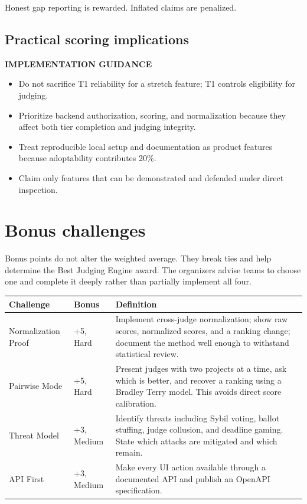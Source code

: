 \documentclass[11pt]{article}
\newcommand{\advisory}{\textcolor{DeepBlue}{\textbf{IMPLEMENTATION GUIDANCE}}}
\begin{document}
\begin{keybox}
Honest gap reporting is rewarded. Inflated claims are penalized.
\end{keybox}

\subsection{Practical scoring implications}

\advisory\par


\begin{itemize}
  \item Do not sacrifice T1 reliability for a stretch feature; T1 controls eligibility for judging.
  \item Prioritize backend authorization, scoring, and normalization because they affect both tier completion and judging integrity.
  \item Treat reproducible local setup and documentation as product features because adoptability contributes 20\%.
  \item Claim only features that can be demonstrated and defended under direct inspection.
\end{itemize}

\section{Bonus challenges}

Bonus points do not alter the weighted average. They break ties and help determine the Best Judging Engine award. The organizers advise teams to choose one and complete it deeply rather than partially implement all four.

\begin{longtable}{@{}L{43mm}L{27mm}L{88mm}@{}}
\toprule
\textbf{Challenge} & \textbf{Bonus} & \textbf{Definition}\\
\midrule
\endhead%
Normalization Proof & +5, Hard & Implement cross-judge normalization; show raw scores, normalized scores, and a ranking change; document the method well enough to withstand statistical review.\\
Pairwise Mode & +5, Hard & Present judges with two projects at a time, ask which is better, and recover a ranking using a Bradley\textendash{} Terry model. This avoids direct score calibration.\\
Threat Model & +3, Medium & Identify threats including Sybil voting, ballot stuffing, judge collusion, and deadline gaming. State which attacks are mitigated and which remain.\\
API First & +3, Medium & Make every UI action available through a documented API and publish an OpenAPI specification.\\
\bottomrule
\end{longtable}
\end{document}
